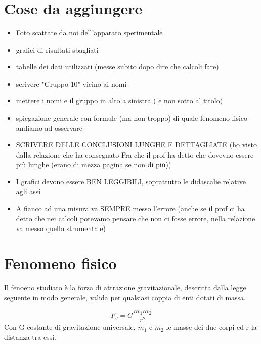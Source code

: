 \documentclass[12pt, a4paper]{article}
\title{\textbf{\scalebox{1.3}{\text{Caduta libera}}}}
\date{}
\begin{document}
\maketitle
{}%
\section{Cose da aggiungere}
\begin{itemize}
    \item Foto scattate da noi dell'apparato sperimentale
    \item grafici di risultati sbagliati
    \item tabelle dei dati utilizzati (messe subito dopo dire che calcoli fare)
    \item scrivere "Gruppo $10$" vicino ai nomi
    \item mettere i nomi e il gruppo in alto a sinistra ( e non sotto al titolo)
    \item spiegazione generale con formule (ma non troppo) di quale fenomeno fisico andiamo ad osservare
    \item SCRIVERE DELLE CONCLUSIONI LUNGHE E DETTAGLIATE (ho visto dalla relazione che ha consegnato Fra che il prof ha detto che dovevno essere più lunghe (erano di mezza pagina se non di più))
    \item I grafici devono essere BEN LEGGIBILI, soprattutto le didascalie relative agli assi
    \item A fianco ad una misura va SEMPRE messo l'errore (anche se il prof ci ha detto che nei calcoli potevamo pensare che non ci fosse errore, nella relazione va messo quello strumentale)
\end{itemize}
\section{Fenomeno fisico}
Il fenoeno studiato è la forza di attrazione gravitazionale, descritta dalla legge seguente in modo generale, valida per qualsiasi coppia di enti dotati di massa. 

\begin{equation}
    F_g = G\frac{m_1 m_2}{r^2}
\end{equation}
Con G costante di gravitazione universale, $m_1$ e $m_2$ le masse dei due corpi ed r la distanza tra essi.
\end{document}
